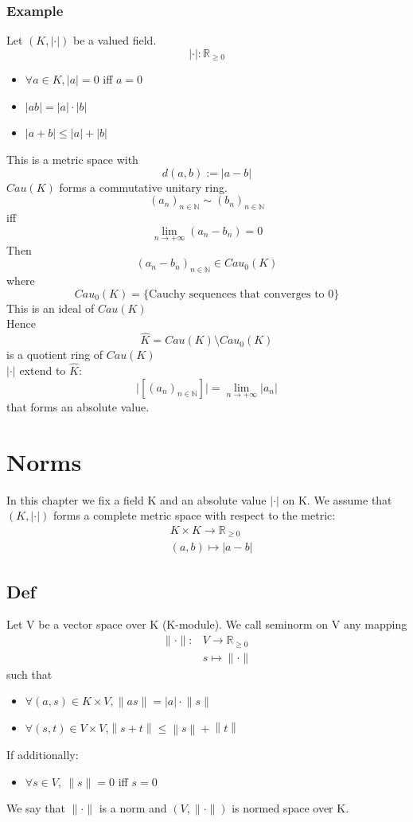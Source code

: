 \documentclass{book}
\begin{document}
\subsection*{Example}
Let $(K,\lvert\cdot\rvert)$ be a valued field.
$$
    \lvert\cdot\rvert: \mathbb{R}_{\geq0}
$$
\begin{itemize}
    \item $\forall a\in K,\lvert a\rvert=0$ iff $a=0$
    \item $\lvert ab\rvert=\lvert a\rvert \cdot\lvert b\rvert$
    \item $\lvert a+b\rvert\leq\lvert a\rvert +\lvert b\rvert$
\end{itemize}
This is a metric space with $$d(a,b):=\lvert a-b\rvert$$
$Cau(K)$ forms a commutative unitary ring. $$(a_n)_{n\in \mathbb{N}}\sim(b_n)_{n\in \mathbb{N}}$$ 
iff
$$ \lim\limits_{n\rightarrow+\infty}(a_n-b_n)=0$$Then $$(a_n-b_n)_{n\in \mathbb{N}}\in Cau_0(K)$$
where
$$Cau_0(K)=\{\text{Cauchy sequences that converges to 0}\}$$
This is an ideal of $Cau(K)$\\
Hence $$\hat{K}=Cau(K)\setminus Cau_0(K)$$ is a quotient ring of $Cau(K)$\\
$\lvert\cdot\rvert$ extend to $\hat{K}$:
$$\lvert[(a_n)_{n\in \mathbb{N}}]\rvert=\lim\limits_{n\rightarrow+\infty}\lvert a_n\rvert$$ that forms an absolute value.
\chapter{Norms}
\newcommand{\norm}[1]{\left\lVert #1 \right\rVert}
In this chapter we fix a field K and an absolute value $\lvert\cdot\rvert$ on K.
We assume that $(K,\lvert\cdot\rvert)$ forms a complete metric space with respect to the metric:$$\begin{aligned}
    &K\times K\rightarrow\mathbb{R}_{\geq 0}\\
    &(a,b)\mapsto\lvert a-b\rvert
\end{aligned}$$
\section{Def}
Let V be a vector space over K (K-module). We call seminorm on V any mapping$$\begin{aligned}
\lVert\cdot\rVert:&V\rightarrow\mathbb{R}_{\geq0}\\ &s\mapsto\lVert\cdot\rVert
\end{aligned}$$
such that \begin{itemize}
    \item $\forall(a,s)\in K\times V,\lVert as\rVert=\lvert a\rvert\cdot\lVert s\rVert$
    \item $\forall(s,t)\in V\times V$,$\norm{s+t}\leq\norm{s}+\norm{t}$
\end{itemize}
If additionally:\begin{itemize}
    \item $\forall s\in V,\ \lVert s\rVert=0$ iff $s=0$
\end{itemize}
We say that $\lVert\cdot\rVert$ is a norm and $(V,\lVert\cdot\rVert)$ is normed space over K.
\end{document}
